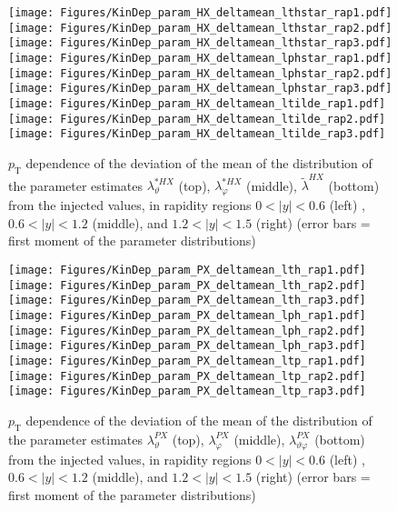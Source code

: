 \documentclass[12pt]{article}
\newcommand{\pT}{p_\mathrm{T}}
\newcommand{\absy}{\left |  y \right |}
\newcommand{\lamtildeHX}{\tilde{\lambda}^{\scriptscriptstyle HX}}
\newcommand{\lamthstarHX}{\lambda^{* \scriptscriptstyle HX}_\vartheta}
\newcommand{\lamphstarHX}{\lambda^{* \scriptscriptstyle HX}_\varphi}
\newcommand{\lamthPX}{\lambda^{\scriptscriptstyle PX}_\vartheta}
\newcommand{\lamphPX}{\lambda^{\scriptscriptstyle PX}_\varphi}
\newcommand{\lamthphPX}{\lambda^{\scriptscriptstyle PX}_{\vartheta \varphi}}
\begin{document}
\begin{figure}[htbp]
\centering
\texttt{[image: Figures/KinDep\_param\_HX\_deltamean\_lthstar\_rap1.pdf]}
\texttt{[image: Figures/KinDep\_param\_HX\_deltamean\_lthstar\_rap2.pdf]}
\texttt{[image: Figures/KinDep\_param\_HX\_deltamean\_lthstar\_rap3.pdf]}
\texttt{[image: Figures/KinDep\_param\_HX\_deltamean\_lphstar\_rap1.pdf]}
\texttt{[image: Figures/KinDep\_param\_HX\_deltamean\_lphstar\_rap2.pdf]}
\texttt{[image: Figures/KinDep\_param\_HX\_deltamean\_lphstar\_rap3.pdf]}
\texttt{[image: Figures/KinDep\_param\_HX\_deltamean\_ltilde\_rap1.pdf]}
\texttt{[image: Figures/KinDep\_param\_HX\_deltamean\_ltilde\_rap2.pdf]}
\texttt{[image: Figures/KinDep\_param\_HX\_deltamean\_ltilde\_rap3.pdf]}
\caption{$\pT$ dependence of the deviation of the mean of the distribution of
the parameter estimates $\lamthstarHX$ (top), $\lamphstarHX$ (middle),
$\lamtildeHX$ (bottom) from the injected values, in rapidity regions
$0<\absy<0.6$ (left) , $0.6<\absy<1.2$ (middle), and $1.2<\absy<1.5$ (right) (error bars = first moment of
the parameter distributions)}
\end{figure}
\clearpage











\begin{figure}[htbp]
\centering
\texttt{[image: Figures/KinDep\_param\_PX\_deltamean\_lth\_rap1.pdf]}
\texttt{[image: Figures/KinDep\_param\_PX\_deltamean\_lth\_rap2.pdf]}
\texttt{[image: Figures/KinDep\_param\_PX\_deltamean\_lth\_rap3.pdf]}
\texttt{[image: Figures/KinDep\_param\_PX\_deltamean\_lph\_rap1.pdf]}
\texttt{[image: Figures/KinDep\_param\_PX\_deltamean\_lph\_rap2.pdf]}
\texttt{[image: Figures/KinDep\_param\_PX\_deltamean\_lph\_rap3.pdf]}
\texttt{[image: Figures/KinDep\_param\_PX\_deltamean\_ltp\_rap1.pdf]}
\texttt{[image: Figures/KinDep\_param\_PX\_deltamean\_ltp\_rap2.pdf]}
\texttt{[image: Figures/KinDep\_param\_PX\_deltamean\_ltp\_rap3.pdf]}
\caption{$\pT$ dependence of the deviation of the mean of the distribution of
the parameter estimates $\lamthPX$ (top), $\lamphPX$ (middle), $\lamthphPX$
(bottom) from the injected values, in rapidity regions $0<\absy<0.6$ (left) ,
$0.6<\absy<1.2$ (middle), and $1.2<\absy<1.5$ (right) (error bars = first moment of the parameter
distributions)}
\end{figure}
\clearpage
\end{document}
